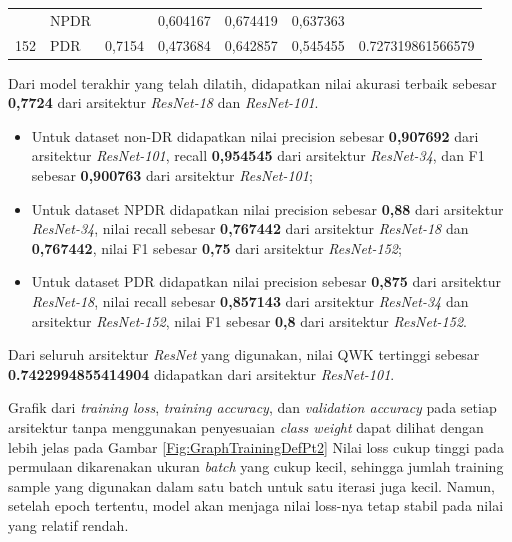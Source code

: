 \begin{table}[hbtp]
\begin{center}
\begin{tabular}{|c|l|c|l|l|l|c|}
			& NPDR                                               &                          & 0,604167                                          & 0,674419                                         & 0,637363                                        &                                      \\ \cline{2-2} \cline{4-6}
			\multirow{-3}{*}{152} & PDR                                                & \multirow{-3}{*}{0,7154} & 0,473684                                          & 0,642857                                         & 0,545455                                        & \multirow{-3}{*}{0.727319861566579}  \\ \hline
		\end{tabular}
	\end{center}
\end{table}

Dari model terakhir yang telah dilatih, didapatkan nilai akurasi terbaik sebesar \textbf{0,7724} dari arsitektur \emph{ResNet-18} dan \emph{ResNet-101}.

\begin{itemize}
	
	\item Untuk dataset non-DR didapatkan nilai precision sebesar \textbf{0,907692} dari arsitektur \emph{ResNet-101}, recall \textbf{0,954545} dari arsitektur \emph{ResNet-34}, dan F1 sebesar \textbf{0,900763} dari arsitektur \emph{ResNet-101};
	
	\item Untuk dataset NPDR didapatkan nilai precision sebesar \textbf{0,88} dari arsitektur \emph{ResNet-34}, nilai recall sebesar \textbf{0,767442} dari arsitektur \emph{ResNet-18} dan \textbf{0,767442}, nilai F1 sebesar \textbf{0,75} dari arsitektur \emph{ResNet-152};
	
	\item Untuk dataset PDR didapatkan nilai precision sebesar \textbf{0,875} dari arsitektur \emph{ResNet-18}, nilai recall sebesar \textbf{0,857143} dari arsitektur \emph{ResNet-34} dan arsitektur \emph{ResNet-152}, nilai F1 sebesar \textbf{0,8} dari arsitektur \emph{ResNet-152}.
	
\end{itemize}

Dari seluruh arsitektur \emph{ResNet} yang digunakan, nilai QWK tertinggi sebesar \textbf{0.7422994855414904} didapatkan dari arsitektur \emph{ResNet-101}.

Grafik dari \emph{training loss}, \emph{training accuracy}, dan \emph{validation accuracy} pada setiap arsitektur tanpa menggunakan penyesuaian \emph{class weight} dapat dilihat dengan lebih jelas pada Gambar \ref{Fig:GraphTrainingDefPt2} Nilai loss cukup tinggi pada permulaan dikarenakan ukuran \emph{batch} yang cukup kecil, sehingga jumlah training sample yang digunakan dalam satu batch untuk satu iterasi juga kecil. Namun, setelah epoch tertentu, model akan menjaga nilai loss-nya tetap stabil pada nilai yang relatif rendah.
\pagebreak

